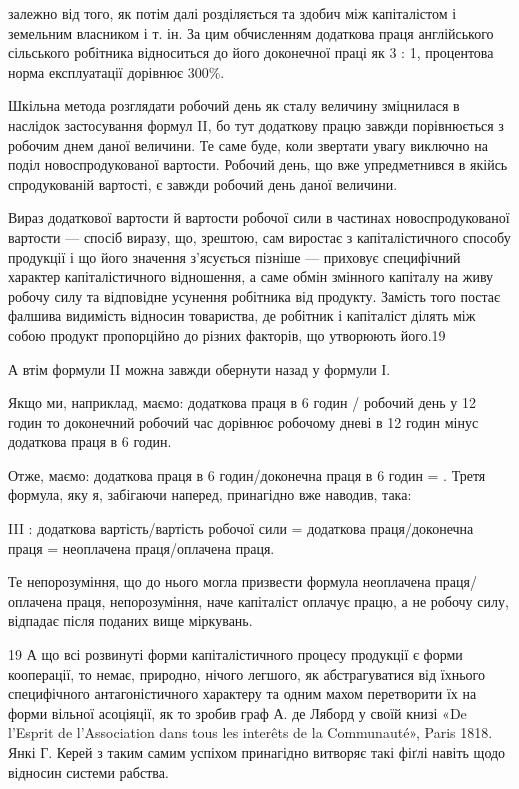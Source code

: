 залежно від того, як потім далі розділяється та здобич між капіталістом
і земельним власником і т. ін. За цим обчисленням
додаткова праця англійського сільського робітника відноситься
до його доконечної праці як 3 : 1, процентова норма експлуатації
дорівнює 300\%.

Шкільна метода розглядати робочий день як сталу величину
зміцнилася в наслідок застосування формул II, бо тут додаткову
працю завжди порівнюється з робочим днем даної величини.
Те саме буде, коли звертати увагу виключно на поділ новоспродукованої
вартости. Робочий день, що вже упредметнився в якійсь
спродукованій вартості, є завжди робочий день даної величини.

Вираз додаткової вартости й вартости робочої сили в частинах
новоспродукованої вартости — спосіб виразу, що, зрештою,
сам виростає з капіталістичного способу продукції і що його
значення з’ясується пізніше — приховує специфічний характер
капіталістичного відношення, а саме обмін змінного капіталу
на живу робочу силу та відповідне усунення робітника від продукту.
Замість того постає фалшива видимість відносин товариства,
де робітник і капіталіст ділять між собою продукт пропорційно
до різних факторів, що утворюють його.19

А втім формули II можна завжди обернути назад у формули І.

Якщо ми, наприклад, маємо: додаткова праця в 6 годин /
робочий день у 12 годин то доконечний
робочий час дорівнює робочому дневі в 12 годин мінус
додаткова праця в 6 годин.

Отже, маємо:
додаткова праця в 6 годин/доконечна праця в 6 годин = .
Третя формула, яку я, забігаючи наперед, принагідно вже
наводив, така:

III : додаткова вартість/вартість робочої сили =
додаткова праця/доконечна праця =
неоплачена праця/оплачена праця.

Те непорозуміння, що до нього могла призвести формула
неоплачена праця/оплачена праця, непорозуміння, наче капіталіст оплачує працю,
а не робочу силу, відпадає після поданих вище міркувань.

19    А що всі розвинуті форми капіталістичного процесу продукції
є форми кооперації, то немає, природно, нічого легшого, як абстрагуватися
від їхнього специфічного антагоністичного характеру та одним
махом перетворити їх на форми вільної асоціяції, як то зробив граф
А. де Ляборд у своїй книзі «De l’Esprit de l’Association dans tous les
interêts de la Communauté», Paris 1818. Янкі Г. Керей з таким самим
успіхом принагідно витворяє такі фіґлі навіть щодо відносин системи
рабства.
